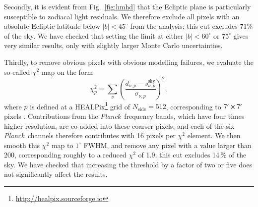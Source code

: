 \documentclass{aa}
\def\Planck{\textit{Planck}}
\begin{document}
Secondly, it is evident from Fig.~\ref{fig:hmhd} that the Ecliptic
plane is particularly susceptible to zodiacal light residuals. We
therefore exclude all pixels with an absolute Ecliptic latitude below
$|b|<45^{\circ}$ from the analysis; this cut excludes 71\% of the
sky. We have checked that setting the limit at either $|b|<60^{\circ}$
or $75^{\circ}$ gives very similar results, only with slightly larger
Monte Carlo uncertainties.

Thirdly, to remove obvious pixels with obvious modelling failures, we
evaluate the so-called $\chi^2$ map on the form
\begin{equation}
\chi_p^2 = \sum_{\nu} \left(\frac{d_{\nu,p}-s_{\nu,p}^{\mathrm{sky}}}{\sigma_{\nu,p}}\right)^2,
\end{equation}
where $p$ is defined at a HEALPix\footnote{\url{http://healpix.sourceforge.io}} grid of $N_{\mathrm{side}}=512$,
corresponding to $7\arcmin\times 7\arcm$ pixels
\citep{healpix}. Contributions from the \Planck\ frequency bands,
which have four times higher resolution, are co-added into these
coarser pixels, and each of the six \Planck\ channels therefore
contributes with 16 pixels per $\chi^2$ element. We then smooth this
$\chi^2$ map to $1^{\circ}$ FWHM, and remove any pixel with a value
larger than 200, corresponding roughly to a reduced $\chi^2$ of 1.9;
this cut excludes 14\,\% of the sky. We have checked that increasing the
threshold by a factor of two or five does not significantly affect the
results.
\end{document}
